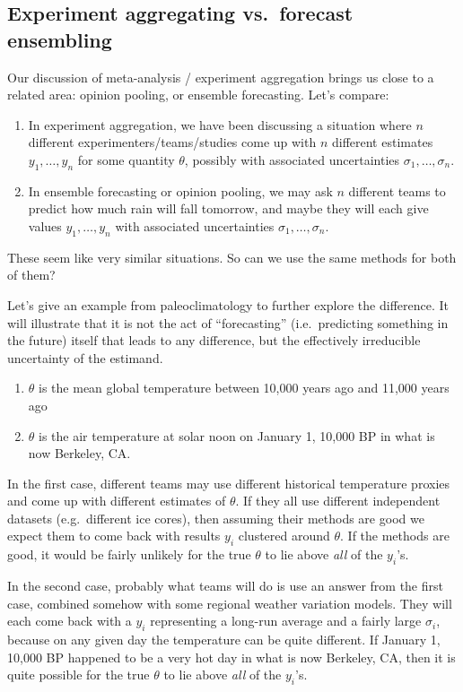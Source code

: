 \documentclass[letterpaper,12pt]{article}
\begin{document}
\subsection{Experiment aggregating vs.~forecast ensembling}\label{sec:exp-vs-forecast}

Our discussion of meta-analysis / experiment aggregation brings us close to a related area: opinion pooling, or ensemble forecasting. Let's compare:

\begin{enumerate}
\item
  In experiment aggregation, we have been discussing a situation where $n$ different experimenters/teams/studies come up with $n$ different estimates $y_1,\ldots,y_n$ for some quantity $\theta$, possibly with associated uncertainties $\sigma_1,\ldots,\sigma_n$.
\item
  In ensemble forecasting or opinion pooling, we may ask $n$ different teams to predict how much rain will fall tomorrow, and maybe they will each give values $y_1,\ldots,y_n$ with associated uncertainties $\sigma_1,\ldots,\sigma_n$.
\end{enumerate}

These seem like very similar situations. So can we use the same methods for both of them?

Let's give an example from paleoclimatology to further explore the difference. It will illustrate that it is not the act of ``forecasting'' (i.e.~predicting something in the future) itself that leads to any difference, but the effectively irreducible uncertainty of the estimand.

\begin{enumerate}
\item
  $\theta$ is the mean global temperature between 10,000 years ago and 11,000 years ago
\item
  $\theta$ is the air temperature at solar noon on January 1, 10,000 BP in what is now Berkeley, CA.
\end{enumerate}

In the first case, different teams may use different historical temperature proxies and come up with different estimates of $\theta$. If they all use different independent datasets (e.g.~different ice cores), then assuming their methods are good we expect them to come back with results $y_i$ clustered around $\theta$. If the methods are good, it would be fairly unlikely for the true $\theta$ to lie above \emph{all} of the $y_i$'s.

In the second case, probably what teams will do is use an answer from the first case, combined somehow with some regional weather variation models. They will each come back with a $y_i$ representing a long-run average and a fairly large $\sigma_i$, because on any given day the temperature can be quite different. If January 1, 10,000 BP happened to be a very hot day in what is now Berkeley, CA, then it is quite possible for the true $\theta$ to lie above \emph{all} of the $y_i$'s.
\end{document}
